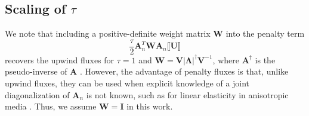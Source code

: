 \documentclass[preprint,10pt]{elsarticle}
\newcommand{\LRp}[1]{\left( #1 \right)}
\newcommand{\LRb}[1]{\left| #1 \right|}
\newcommand{\jump}[1] {\ensuremath{\llbracket#1\rrbracket}}
\newcommand{\note}[1]{#1}
\begin{document}
\subsection{Scaling of $\tau$}

We note that including a positive-definite weight matrix $\bm{W}$ into the penalty term
\[
\frac{\tau}{2} \bm{A}_n^T \bm{W}\bm{A}_n\jump{\bm{U}}
\]
recovers the upwind fluxes for $\tau = 1$ and $\bm{W} = \bm{V}\LRb{\bm{\Lambda}}^{\dagger}\bm{V}^{-1}$, where $\bm{A}^{\dagger}$ is the pseudo-inverse of $\bm{A}$ \cite{horn2012matrix}.  However, the advantage of penalty fluxes is that, unlike upwind fluxes, they can be used when explicit knowledge of a \note{joint} diagonalization of $\bm{A}_n$ is not known, such as for linear elasticity in anisotropic media \cite{ye2016discontinuous}.  Thus, we assume $\bm{W} = \bm{I}$ in this work.  
\end{document}
